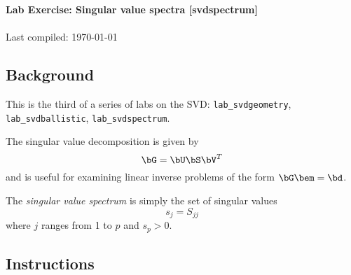 \documentclass[11pt,titlepage,fleqn]{article}
\begin{document}

\begin{spacing}{1.2}
\centering
{\large \bf Lab Exercise: Singular value spectra [svdspectrum]} \\
\cltag\ \\
Last compiled: \today
\end{spacing}


\subsection*{Background}

This is the third of a series of labs on the SVD: \verb+lab_svdgeometry+, \verb+lab_svdballistic+, \verb+lab_svdspectrum+.

The singular value decomposition is given by
%
\begin{equation*}
\bG = \bU\bS\bV^T
\end{equation*}
%
and is useful for examining linear inverse problems of the form $\bG\bem = \bd$.

The {\em singular value spectrum} is simply the set of singular values
%
\begin{equation*}
s_j = S_{jj}
\end{equation*}
%
where $j$ ranges from 1 to $p$ and $s_p > 0$.


\subsection*{Instructions}
\end{document}
